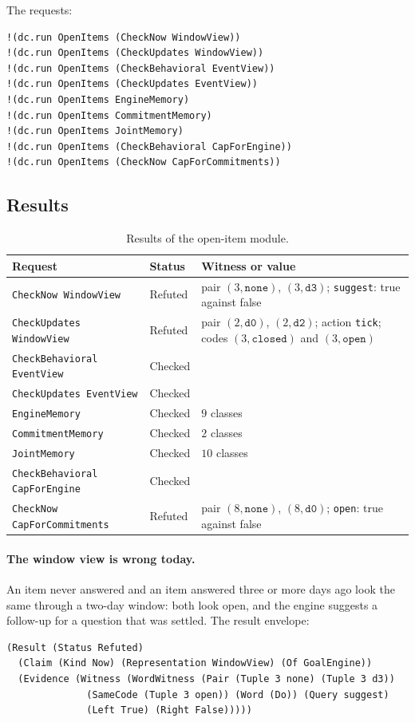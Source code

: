 \documentclass[11pt]{article}
\newcommand{\code}[1]{\texttt{#1}}
\theoremstyle{definition}
\theoremstyle{plain}
\begin{document}
The requests:
\begin{lstlisting}[style=mettamod]
!(dc.run OpenItems (CheckNow WindowView))
!(dc.run OpenItems (CheckUpdates WindowView))
!(dc.run OpenItems (CheckBehavioral EventView))
!(dc.run OpenItems (CheckUpdates EventView))
!(dc.run OpenItems EngineMemory)
!(dc.run OpenItems CommitmentMemory)
!(dc.run OpenItems JointMemory)
!(dc.run OpenItems (CheckBehavioral CapForEngine))
!(dc.run OpenItems (CheckNow CapForCommitments))
\end{lstlisting}

\subsection{Results}

\begin{table}[ht]
\centering\small
\begin{tabularx}{\textwidth}{>{\raggedright\arraybackslash}p{4.6cm}>{\raggedright\arraybackslash}p{1.7cm}X}
\toprule
Request & Status & Witness or value\\
\midrule
\code{CheckNow WindowView} & Refuted & pair $(3,\code{none})$, $(3,\code{d3})$; \code{suggest}: true
against false\\
\code{CheckUpdates WindowView} & Refuted & pair $(2,\code{d0})$, $(2,\code{d2})$; action
\code{tick}; codes $(3,\code{closed})$ and $(3,\code{open})$\\
\code{CheckBehavioral EventView} & Checked & \\
\code{CheckUpdates EventView} & Checked & \\
\code{EngineMemory} & Checked & $9$ classes\\
\code{CommitmentMemory} & Checked & $2$ classes\\
\code{JointMemory} & Checked & $10$ classes\\
\code{CheckBehavioral CapForEngine} & Checked & \\
\code{CheckNow CapForCommitments} & Refuted & pair $(8,\code{none})$, $(8,\code{d0})$; \code{open}:
true against false\\
\bottomrule
\end{tabularx}
\caption{Results of the open-item module.}\label{tab:p1}
\end{table}

\paragraph{The window view is wrong today.} An item never answered and an item answered three or
more days ago look the same through a two-day window: both look open, and the engine suggests a
follow-up for a question that was settled. The result envelope:
\begin{lstlisting}
(Result (Status Refuted)
  (Claim (Kind Now) (Representation WindowView) (Of GoalEngine))
  (Evidence (Witness (WordWitness (Pair (Tuple 3 none) (Tuple 3 d3))
              (SameCode (Tuple 3 open)) (Word (Do)) (Query suggest)
              (Left True) (Right False)))))
\end{lstlisting}
\end{document}
